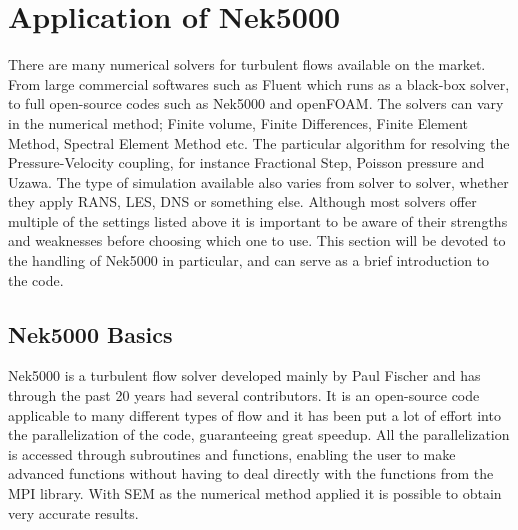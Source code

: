 
\chapter{Application of Nek5000} %

\label{nek} %


There are many numerical solvers for turbulent flows available on the market.
From large commercial softwares such as Fluent which runs as a 
black-box solver, to full open-source codes such as Nek5000 and openFOAM. 
The solvers can vary in the numerical method; Finite volume, Finite Differences, 
Finite Element Method, Spectral Element Method etc. The particular algorithm 
for resolving the Pressure-Velocity coupling, for instance Fractional Step, Poisson pressure and 
Uzawa. The type of simulation available also varies from solver to solver, whether
they apply RANS, LES, DNS or something else. Although most solvers offer multiple of the settings
listed above it is important to be aware of their strengths and weaknesses before choosing which 
one to use. This section will be devoted to the handling of Nek5000 in particular, and can serve
as a brief introduction to the code.

\section{Nek5000 Basics}

Nek5000 is a turbulent flow solver developed mainly by Paul Fischer
and has through the past 20 years had several contributors. 
It is an open-source code applicable to many different types of flow 
and it has been put a lot of effort into the parallelization of the code, 
guaranteeing great speedup. All the parallelization is accessed through subroutines
and functions, enabling the user to make advanced functions without having to 
deal directly with the functions from the MPI library.
With SEM as the numerical method applied it is possible to obtain very accurate results.  

